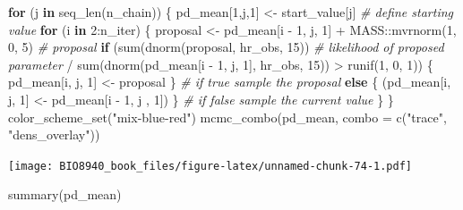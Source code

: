 \documentclass[
  12pt,
]{book}
\newenvironment{Shaded}{\begin{snugshade}}{\end{snugshade}}
\newcommand{\AttributeTok}[1]{\textcolor[rgb]{0.77,0.63,0.00}{#1}}
\newcommand{\CommentTok}[1]{\textcolor[rgb]{0.56,0.35,0.01}{\textit{#1}}}
\newcommand{\ControlFlowTok}[1]{\textcolor[rgb]{0.13,0.29,0.53}{\textbf{#1}}}
\newcommand{\DecValTok}[1]{\textcolor[rgb]{0.00,0.00,0.81}{#1}}
\newcommand{\FunctionTok}[1]{\textcolor[rgb]{0.00,0.00,0.00}{#1}}
\newcommand{\NormalTok}[1]{#1}
\newcommand{\OtherTok}[1]{\textcolor[rgb]{0.56,0.35,0.01}{#1}}
\newcommand{\SpecialCharTok}[1]{\textcolor[rgb]{0.00,0.00,0.00}{#1}}
\newcommand{\StringTok}[1]{\textcolor[rgb]{0.31,0.60,0.02}{#1}}
\begin{document}
\begin{Shaded}
\begin{Highlighting}[]
\ControlFlowTok{for}\NormalTok{ (j }\ControlFlowTok{in} \FunctionTok{seq\_len}\NormalTok{(n\_chain)) \{}
\NormalTok{  pd\_mean[}\DecValTok{1}\NormalTok{,j,}\DecValTok{1}\NormalTok{] }\OtherTok{\textless{}{-}}\NormalTok{ start\_value[j] }\CommentTok{\# define starting value}
  \ControlFlowTok{for}\NormalTok{ (i }\ControlFlowTok{in} \DecValTok{2}\SpecialCharTok{:}\NormalTok{n\_iter) \{}
\NormalTok{    proposal }\OtherTok{\textless{}{-}}\NormalTok{ pd\_mean[i }\SpecialCharTok{{-}} \DecValTok{1}\NormalTok{, j, }\DecValTok{1}\NormalTok{] }\SpecialCharTok{+}\NormalTok{ MASS}\SpecialCharTok{::}\FunctionTok{mvrnorm}\NormalTok{(}\DecValTok{1}\NormalTok{, }\DecValTok{0}\NormalTok{, }\DecValTok{5}\NormalTok{) }\CommentTok{\# proposal}
    \ControlFlowTok{if}\NormalTok{ (}\FunctionTok{sum}\NormalTok{(}\FunctionTok{dnorm}\NormalTok{(proposal, hr\_obs, }\DecValTok{15}\NormalTok{)) }\CommentTok{\# likelihood of proposed parameter}
      \SpecialCharTok{/} \FunctionTok{sum}\NormalTok{(}\FunctionTok{dnorm}\NormalTok{(pd\_mean[i }\SpecialCharTok{{-}} \DecValTok{1}\NormalTok{, j, }\DecValTok{1}\NormalTok{], hr\_obs, }\DecValTok{15}\NormalTok{)) }\SpecialCharTok{\textgreater{}} \FunctionTok{runif}\NormalTok{(}\DecValTok{1}\NormalTok{, }\DecValTok{0}\NormalTok{, }\DecValTok{1}\NormalTok{)) \{}
\NormalTok{      pd\_mean[i, j, }\DecValTok{1}\NormalTok{] }\OtherTok{\textless{}{-}}\NormalTok{ proposal}
\NormalTok{    \} }\CommentTok{\# if true sample the proposal}
    \ControlFlowTok{else}\NormalTok{ \{}
\NormalTok{      (pd\_mean[i, j, }\DecValTok{1}\NormalTok{] }\OtherTok{\textless{}{-}}\NormalTok{ pd\_mean[i }\SpecialCharTok{{-}} \DecValTok{1}\NormalTok{, j , }\DecValTok{1}\NormalTok{])}
\NormalTok{    \} }\CommentTok{\# if false sample the current value}
\NormalTok{  \}}
\NormalTok{\}}
\FunctionTok{color\_scheme\_set}\NormalTok{(}\StringTok{"mix{-}blue{-}red"}\NormalTok{)}
\FunctionTok{mcmc\_combo}\NormalTok{(pd\_mean, }\AttributeTok{combo =} \FunctionTok{c}\NormalTok{(}\StringTok{"trace"}\NormalTok{, }\StringTok{"dens\_overlay"}\NormalTok{))}
\end{Highlighting}
\end{Shaded}

\texttt{[image: BIO8940\_book\_files/figure-latex/unnamed-chunk-74-1.pdf]}

\begin{Shaded}
\begin{Highlighting}[]
\FunctionTok{summary}\NormalTok{(pd\_mean)}
\end{Highlighting}
\end{Shaded}
\end{document}
